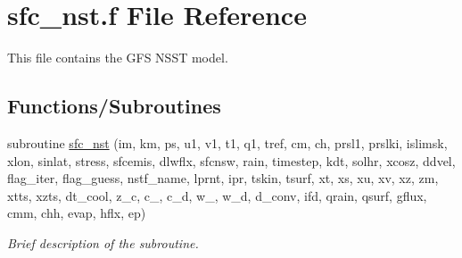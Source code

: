 \hypertarget{sfc__nst_8f}{}\section{sfc\+\_\+nst.\+f File Reference}
\label{sfc__nst_8f}


This file contains the G\+FS N\+S\+ST model.  


\subsection*{Functions/\+Subroutines}
\textbf{ }\par
\begin{DoxyCompactItemize}
\item 
subroutine \hyperlink{group___g_f_s___n_s_s_t_gaed7d47bed74095e3d9fb0c30814ffa63}{sfc\+\_\+nst} (im, km, ps, u1, v1, t1, q1, tref, cm, ch, prsl1, prslki, islimsk, xlon, sinlat, stress, sfcemis, dlwflx, sfcnsw, rain, timestep, kdt, solhr, xcosz, ddvel, flag\+\_\+iter, flag\+\_\+guess, nstf\+\_\+name, lprnt, ipr, tskin, tsurf, xt, xs, xu, xv, xz, zm, xtts, xzts, dt\+\_\+cool, z\+\_\+c, c\+\_, c\+\_\+d, w\+\_, w\+\_\+d, d\+\_\+conv, ifd, qrain, qsurf, gflux, cmm, chh, evap, hflx, ep)
\begin{DoxyCompactList}\small\item\em Brief description of the subroutine. \end{DoxyCompactList}\end{DoxyCompactItemize}

